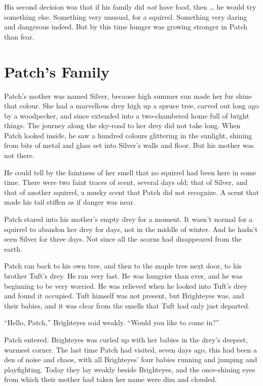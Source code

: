 \documentclass[12pt]{memoir}
\begin{document}
His second decision was that if his family did \textit{not} have food,
then … he would try something else. Something very unusual, for a
squirrel. Something very daring and dangerous indeed. But by this time
hunger was growing stronger in Patch than fear.


\section{Patch’s Family}

Patch’s mother was named Silver, because high summer sun made her fur
shine that colour. She had a marvellous drey high up a spruce tree,
carved out long ago by a woodpecker, and since extended into a
two-chambered home full of bright things. The journey along the
sky-road to her drey did not take long. When Patch looked inside, he
saw a hundred colours glittering in the sunlight, shining from bits of
metal and glass set into Silver’s walls and floor. But his mother was
not there.

He could tell by the faintness of her smell that no squirrel had been
here in some time. There were two faint traces of scent, several days
old; that of Silver, and that of another squirrel, a musky scent that
Patch did not recognize. A scent that made his tail stiffen as if
danger was near.

Patch stared into his mother’s empty drey for a moment. It wasn’t
normal for a squirrel to abandon her drey for days, not in the middle
of winter. And he hadn’t seen Silver for three days. Not since all the
acorns had disappeared from the earth.

Patch ran back to his own tree, and then to the maple tree next door,
to his brother Tuft’s drey. He ran very fast. He was hungrier than
ever, and he was beginning to be very worried. He was relieved when he
looked into Tuft’s drey and found it occupied. Tuft himself was not
present, but Brighteyes was, and their babies, and it was clear from
the smells that Tuft had only just departed.

“Hello, Patch,” Brighteyes said weakly. “Would you like to come in?”

Patch entered. Brighteyes was curled up with her babies in the drey’s
deepest, warmest corner. The last time Patch had visited, seven days
ago, this had been a den of noise and chaos, with all Brighteyes’ four
babies running and jumping and playfighting. Today they lay weakly
beside Brighteyes, and the once-shining eyes from which their mother
had taken her name were dim and clouded.
\end{document}
